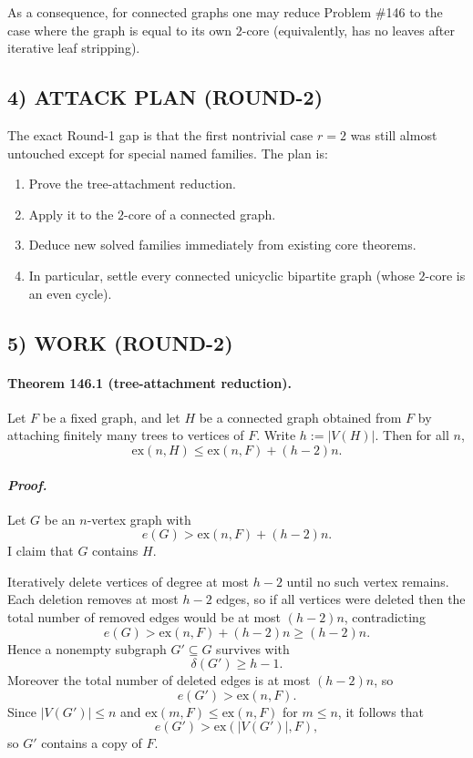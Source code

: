 As a consequence, for connected graphs one may reduce Problem \#146 to the case where the graph
is equal to its own $2$-core (equivalently, has no leaves after iterative leaf stripping).

\subsection*{4) ATTACK PLAN (ROUND-2)}

The exact Round-1 gap is that the first nontrivial case $r=2$ was still almost untouched except for
special named families. The plan is:

\begin{enumerate}
\item Prove the tree-attachment reduction.
\item Apply it to the $2$-core of a connected graph.
\item Deduce new solved families immediately from existing core theorems.
\item In particular, settle every connected unicyclic bipartite graph (whose $2$-core is an even cycle).
\end{enumerate}

\subsection*{5) WORK (ROUND-2)}

\paragraph{\textbf{Theorem 146.1 (tree-attachment reduction).}}
Let $F$ be a fixed graph, and let $H$ be a connected graph obtained from $F$ by attaching finitely
many trees to vertices of $F$. Write $h:=|V(H)|$. Then for all $n$,
\[
\mathrm{ex}(n,H)\le \mathrm{ex}(n,F)+(h-2)n.
\]

\paragraph{\textit{Proof.}}
Let $G$ be an $n$-vertex graph with
\[
e(G)>\mathrm{ex}(n,F)+(h-2)n.
\]
I claim that $G$ contains $H$.

Iteratively delete vertices of degree at most $h-2$ until no such vertex remains. Each deletion
removes at most $h-2$ edges, so if all vertices were deleted then the total number of removed edges
would be at most $(h-2)n$, contradicting
\[
e(G)>\mathrm{ex}(n,F)+(h-2)n\ge (h-2)n.
\]
Hence a nonempty subgraph $G'\subseteq G$ survives with
\[
\delta(G')\ge h-1.
\]
Moreover the total number of deleted edges is at most $(h-2)n$, so
\[
e(G')> \mathrm{ex}(n,F).
\]
Since $|V(G')|\le n$ and $\mathrm{ex}(m,F)\le \mathrm{ex}(n,F)$ for $m\le n$, it follows that
\[
e(G')>\mathrm{ex}(|V(G')|,F),
\]
so $G'$ contains a copy of $F$.

